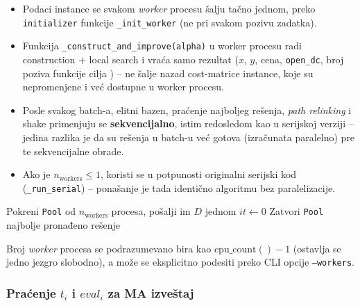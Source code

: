 \documentclass[12pt,a4paper]{article}
\begin{document}
\begin{itemize}
  \item Podaci instance se svakom \textit{worker} procesu šalju tačno
    jednom, preko \texttt{initializer} funkcije \texttt{\_init\_worker}
    (ne pri svakom pozivu zadatka).
  \item Funkcija \texttt{\_construct\_and\_improve(alpha)} u worker procesu
    radi construction $+$ local search i vraća samo rezultat
    ($x$, $y$, cena, \texttt{open\_dc}, broj poziva funkcije cilja
    ) -- ne šalje nazad cost-matrice instance, koje su nepromenjene
    i već dostupne u worker procesu.
  \item Posle svakog batch-a, elitni bazen, praćenje najboljeg rešenja,
    \textit{path relinking} i shake primenjuju se \textbf{sekvencijalno},
    istim redosledom kao u serijskoj verziji -- jedina razlika je da su
    rešenja u batch-u već gotova (izračunata paralelno) pre te sekvencijalne
    obrade.
  \item Ako je $n_{\text{workers}} \le 1$, koristi se u potpunosti originalni
    serijski kod (\texttt{\_run\_serial}) -- ponašanje je tada identično
    algoritmu bez paralelizacije.
\end{itemize}

\begin{algorithm}[H]
\caption{GRASP\_Parallel$(D,\, T,\, n_{\text{workers}})$ -- razlika u odnosu na serijsku verziju}
\label{alg:parallel}
\SetAlgoLined
Pokreni \texttt{Pool} od $n_{\text{workers}}$ procesa, pošalji im $D$ jednom\;
$it \leftarrow 0$\;
Zatvori \texttt{Pool}\;
\Return najbolje pronađeno rešenje
\end{algorithm}

Broj \textit{worker} procesa se podrazumevano bira kao $\text{cpu\_count}()-1$
(ostavlja se jedno jezgro slobodno), a može se eksplicitno podesiti preko
CLI opcije \texttt{--workers}.

\subsubsection{Praćenje $t_i$ i $eval_i$ za MA izveštaj}
\end{document}
